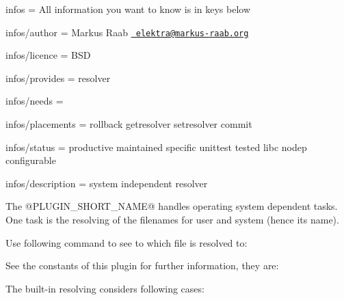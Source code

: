 
\begin{DoxyItemize}
\item infos = All information you want to know is in keys below
\item infos/author = Markus Raab \href{mailto:elektra@markus-raab.org}{\texttt{ elektra@markus-\/raab.\+org}}
\item infos/licence = B\+SD
\item infos/provides = resolver
\item infos/needs =
\item infos/placements = rollback getresolver setresolver commit
\item infos/status = productive maintained specific unittest tested libc nodep configurable
\item infos/description = system independent resolver
\end{DoxyItemize}

The {\ttfamily @P\+L\+U\+G\+I\+N\+\_\+\+S\+H\+O\+R\+T\+\_\+\+N\+A\+ME@} handles operating system dependent tasks. One task is the resolving of the filenames for user and system (hence its name).

Use following command to see to which file is resolved to\+:


\begin{DoxyCode}{0}
\end{DoxyCode}


See the constants of this plugin for further information, they are\+:


\begin{DoxyCode}{0}
\end{DoxyCode}


The built-\/in resolving considers following cases\+:



